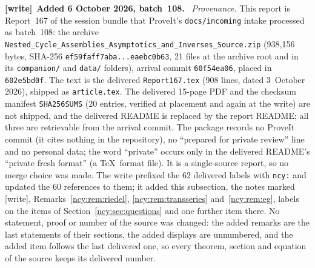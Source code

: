 \documentclass[11pt,letterpaper]{article}
\numberwithin{equation}{section}
\theoremstyle{remark}\newtheorem{remark}[theorem]{Remark}
\newcommand{\file}[1]{\nolinkurl{#1}}
\newenvironment{writenote}[1][]{\par\smallskip\begingroup\small
 \noindent\textbf{[write]}\if\relax\detokenize{#1}\relax\else~\textbf{#1.}\fi\ }%
 {\par\endgroup\smallskip}
\theoremstyle{definition}\newtheorem{definition}[theorem]{Definition}\theoremstyle{plain}
\begin{document}
\begin{writenote}[Added 6 October 2026, batch~108]
\emph{Provenance.} This report is Report~167 of the session bundle that
ProveIt's \file{docs/incoming} intake processed as batch~108: the archive
\file{Nested_Cycle_Assemblies_Asymptotics_and_Inverses_Source.zip}
(938{,}156 bytes, SHA-256 \file{ef59faff7aba...eaebc0b63}, 21 files at the
archive root and in its \file{companion/} and \file{data/} folders), arrival
commit \file{60f54ea06}, placed in \file{602e5bd0f}. The text is the
delivered \file{Report167.tex} (908 lines, dated 3~October 2026), shipped as
\file{article.tex}. The delivered 15-page PDF and the checksum manifest
\file{SHA256SUMS} (20 entries, verified at placement and again at the write)
are not shipped, and the delivered README is replaced by the report README;
all three are retrievable from the arrival commit. The package records no
ProveIt commit (it cites nothing in the repository), no ``prepared for
private review'' line and no personal data; the word ``private'' occurs only
in the delivered README's ``private fresh format'' (a \TeX\ format file). It
is a single-source report, so no merge choice was made. The write prefixed
the 62 delivered labels with \file{ncy:} and updated the 60 references to
them; it added this subsection, the notes marked [write],
Remarks~\ref{ncy:rem:riedel}, \ref{ncy:rem:transseries} and~\ref{ncy:rem:eg},
labels on the items of Section~\ref{ncy:sec:questions} and one further item
there. No statement, proof or number of the source was changed: the added
remarks are the last statements of their sections, the added displays are
unnumbered, and the added item follows the last delivered one, so every
theorem, section and equation of the source keeps its delivered number.


\end{writenote}
\end{document}
